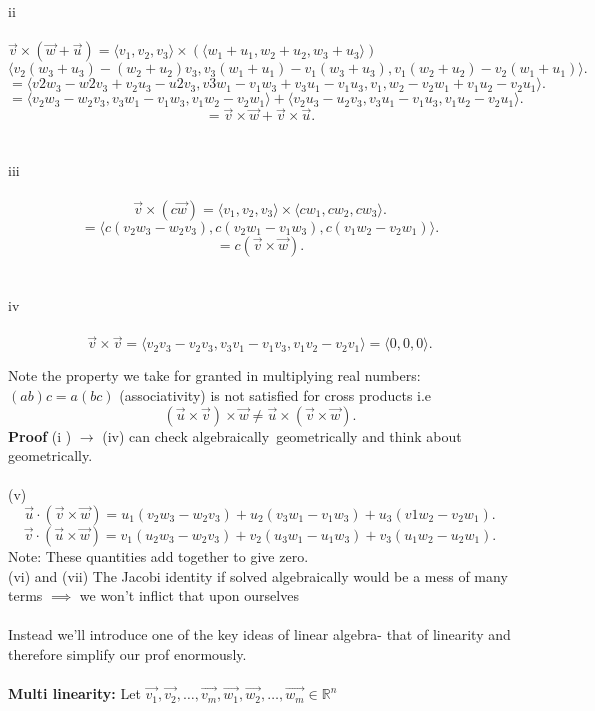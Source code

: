 \documentclass{report}
\begin{document}
    ii
    \\
    \\
    $\vec{v} \times  \left( \vec{w} +\vec{u}  \right) = \langle v_1,v_2,v_3  \rangle \times  \left(  \langle w_1+u_1, w_2+u_2, w_3+u_3  \rangle  \right) $ 
    \[
    \langle v_2\left( w_3+u_3 \right) - \left( w_2+u_2 \right) v_3, v_3\left( w_1+u_1 \right) - v_1\left( w_3+u_3 \right) , v_1\left( w_2+u_2 \right) - v_2\left( w_1+u_1 \right)   \rangle 
    .\] \[
    = \langle v2w_3-w2v_3+v_2u_3-u2v_3, v3w_1-v_1w_3+v_3u_1-v_1u_3, v_1,w_2-v_2w_1+v_1u_2-v_2u_1  \rangle 
    .\] 
\[
= \langle v_2w_3-w_2v_3, v_3w_1-v_1w_3, v_1w_2-v_2w_1  \rangle + \langle v_2u_3-u_2v_3, v_3u_1-v_1u_3, v_1u_2-v_2u_1  \rangle 
.\] \[
= \vec{v} \times \vec{w} +\vec{ v} \times \vec{u} 
.\] 
\\
\\
iii\\
\\
\[
\vec{v} \times \left( c\vec{w} \right) = \langle v_1,v_2,v_3  \rangle \times  \langle cw_1,cw_2,cw_3  \rangle 
.\] \[
= \langle c \left( v_2w_3 -w_2v_3 \right) , c\left( v_2w_1-v_1w_3 \right) , c\left( v_1w_2-v_2w_1 \right)   \rangle 
.\] \[
=c \left( \vec{v} \times  \vec{w}  \right) 
.\] 
\\
\\
iv
\\
\\
\[
\vec{v} \times \vec{v} = \langle v_2v_3- v_2v_3, v_3v_1- v_1v_3, v_1v_2-v_2v_1  \rangle = \langle 0,0,0  \rangle 
.\] 

Note the property we take for granted in multiplying real numbers: $\left( ab \right)c = a \left( bc  \right)   $ (associativity) is not satisfied for cross products i.e
\[
\left( \vec{u} \times  \vec{v}  \right) \times  \vec{w}  \neq \vec{u} \times  \left( \vec{v}  \times  \vec{w}  \right) 
.\] 
\textbf{Proof} (i ) $\to$ (iv) can check algebraically\ geometrically and think about geometrically.
\\
\\
(v)  \[
\vec{u} \cdot  \left(  \vec{v} \times  \vec{w}  \right)= u_1 \left( v_2w_3-w_2v_3  \right) + u_2 \left( v_3w_1-v_1w_3 \right) + u_3 \left(  v1 w_2 -v_2w_1 \right)  
.\] \[
\vec{v} \cdot  \left( \vec{u} \times  \vec{w}  \right) = v_1 \left(  u_2w_3-w_2v_3 \right) + v_2\left( u_3w_1-u_1w_3 \right) + v_3 \left( u_1w_2-u_2w_1 \right) 
.\] 
Note: These quantities add together to give zero.\\

(vi) and (vii) The Jacobi identity if solved algebraically would be a mess of many terms $\implies$ we won't inflict that upon ourselves \\
\\
Instead we'll introduce one of the key ideas of linear algebra- that of linearity and therefore simplify our prof enormously. \\
\\
\textbf{Multi linearity:}  Let $\vec{v_1} ,\vec{v_2} ,\ldots, \vec{v_m} , \vec{w_1} ,\vec{w_2} ,\ldots, \vec{w_m} \in \mathbb{R} ^{n} $
\end{document}

